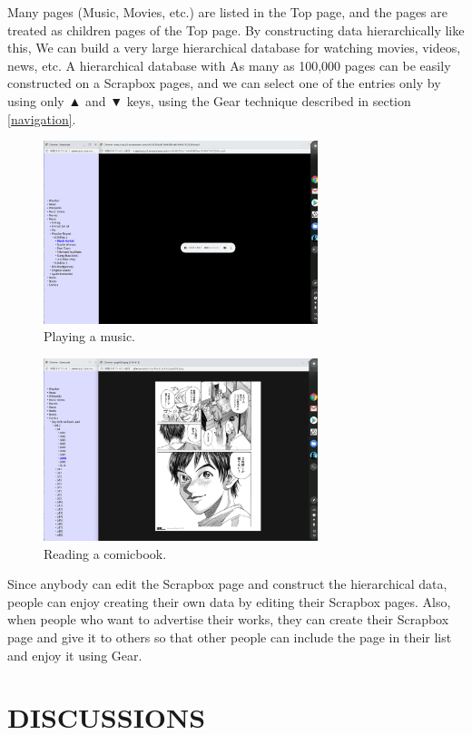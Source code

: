 \documentclass{article}
\def\up{▲}
\def\down{▼}
\def\SB{\textsf{\small Scrapbox}}
\begin{document}
Many pages (Music, Movies, etc.) are listed in the Top page, and
the pages are treated as children pages of the Top page.
By constructing data hierarchically like this,
We can build a very large hierarchical database for watching movies, videos, news, etc.
A hierarchical database with
As many as 100,000 pages can be easily constructed on a {\SB} pages, and
we can select one of the entries only by using only {\up} and {\down} keys,
using the Gear technique described in section \ref{navigation}.

\begin{figure}[H]
\centerline{\includegraphics[width=80mm,bb=0 0 2400 1600]{figures/blackmarket.png}}
\caption{Playing a music.}
\label{blackmarket}
\end{figure}

\begin{figure}[H]
\centerline{\includegraphics[width=80mm,bb=0 0 2400 1600]{figures/blackjack.png}}
\caption{Reading a comicbook.}
\label{blackjack}
\end{figure}

Since anybody can edit the {\SB} page and construct the hierarchical data,
people can enjoy creating their own data by editing their {\SB} pages.
Also, when people who want to advertise their works,
they can create their {\SB} page
and give it to others so that other people can include the page
in their list and enjoy it using Gear.

\section{DISCUSSIONS}
\end{document}
